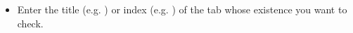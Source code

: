 
\begin{itemize}
\item Enter the title (e.g. ) or index (e.g. ) of the tab whose existence you want to check.  
\end{itemize}

